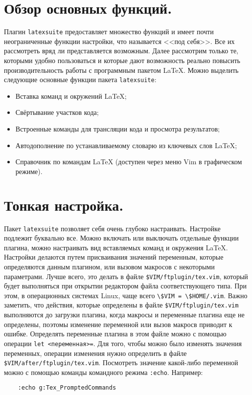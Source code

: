 \documentclass[a4paper]{article}
\begin{document}
\part{Обзор основных функций.}\label{part:main-functions}
Плагин \texttt{latexsuite} предоставляет множество функций и имеет почти
неограниченные функции настройки, что называется <<под себя>>. Все их
рассмотреть вряд ли представляется возможным. Далее рассмотрим только те,
которыми удобно пользоваться и которые дают возможность реально 
повысить производительность работы с программным пакетом \LaTeX.
Можно выделить следующие основные функции пакета \texttt{latexsuite}:
\begin{itemize}
	\item Вставка команд и окружений \LaTeX;
	\item Свёртывание участков кода;
	\item Встроенные команды для трансляции кода и просмотра результатов;
	\item Автодополнение по устанавливаемому словарю из ключевых слов \LaTeX{};
	\item Справочник по командам \LaTeX{} (доступен через меню Vim в графическом режиме).
\end{itemize}
\part{Тонкая настройка.}\label{part:settings}
Пакет \texttt{latexsuite} позволяет себя очень глубоко настраивать.
Настройке подлежит буквально все. Можно включать или выключать отдельные функции плагина,
можно настраивать вид вставляемых команд и окружения \LaTeX. Настройки делаются путем
присваивания значений переменным, которые определяются данным плагином, или вызовом 
макросов с некоторыми параметрами. Лучше всего, это делать в файле \verb|$VIM/ftplugin/tex.vim|,
который будет выполняться при открытии редактором файла соответствующего типа. 
При этом, в операционных системах Linux, 
чаще всего \verb|\$VIM = \$HOME/.vim|. Важно заметить, что действия, которые определены в
файле \verb|$VIM/ftplugin/tex.vim| выполняются до загрузки плагина, когда макросы и переменные
плагина еще не определены, поэтомы изменение переменной или вызов макросв приводит к ошибке. 
Определять переменные плагина в этом файле можно с помощью операции \verb|let <переменная>=|. 
Для того, чтобы можно было изменять значения переменных, операции изменения нужно определить в файле
\verb|$VIM/after/ftplugin/tex.vim|.
Посмотреть значение какой-либо переменной можно с помощью команды командного режима \verb|:echo|. 
Например:
\begin{verbatim}
	:echo g:Tex_PromptedCommands
\end{verbatim}
\sloppy
\end{document}
